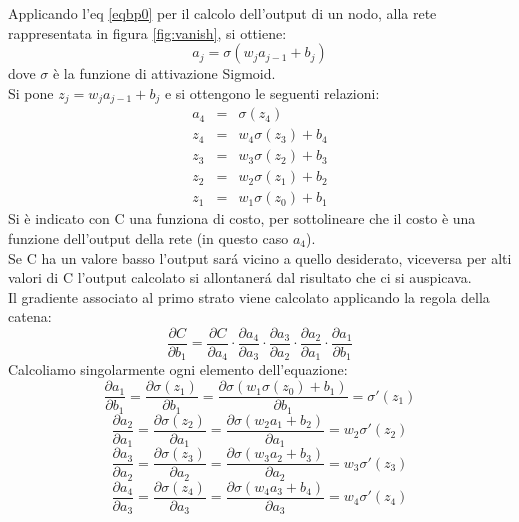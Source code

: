 \documentclass[a4paper,12pt]{report}
\begin{document}
Applicando l'eq \ref{eqbp0} per il calcolo dell'output di un nodo, alla rete rappresentata in figura \ref{fig:vanish}, si ottiene:
\begin{equation}
a_j=\sigma(w_j a_{j-1} +b_j)
\end{equation}
dove $\sigma$ \`e la funzione di attivazione Sigmoid.\\
Si pone $z_j=w_j a_{j-1} +b_j$ e si ottengono le seguenti relazioni:
\begin{eqnarray}
a_4&=&\sigma(z_4)\nonumber \\
z_4&=&w_4 \sigma(z_3)+b_4 \nonumber \\
z_3&=&w_3 \sigma(z_2)+b_3 \nonumber \\
z_2&=&w_2 \sigma(z_1)+b_2 \nonumber \\
z_1&=&w_1 \sigma(z_0)+b_1 \nonumber
\end{eqnarray}
Si \`e indicato con C una funziona di costo, per sottolineare che il costo \`e una funzione dell'output della rete (in questo caso $a_4$).\\
Se C ha un valore basso l'output sar\'{a} vicino a quello desiderato, viceversa per alti valori di C l'output calcolato si allontaner\'{a} dal risultato che ci si auspicava.\\
Il gradiente associato al primo strato viene calcolato applicando la regola della catena:
\begin{equation} \label{catena}
\frac{\partial C}{\partial b_1}=\frac{\partial C}{\partial a_4} \cdot \frac{\partial a_4}{\partial a_3} \cdot \frac{\partial a_3}{\partial a_2} \cdot \frac{\partial a_2}{\partial a_1} \cdot \frac{\partial a_1}{\partial b_1}
\end{equation}
Calcoliamo singolarmente ogni elemento dell'equazione:
\begin{equation}
\frac{\partial a_1}{\partial b_1} = \frac{\partial \sigma (z_1)}{\partial b_1} = \frac{\partial \sigma(w_1 \sigma(z_0)+b_1)}{\partial b_1} = \sigma '(z_1)
\end{equation}
\begin{equation}
\frac{\partial a_2}{\partial a_1}=\frac{\partial \sigma (z_2)}{\partial a_1} = \frac{\partial \sigma(w_2 a_1 +b_2)}{\partial a_1} = w_2 \sigma ' (z_2)
\end{equation}
\begin{equation}
 \frac{\partial a_3}{\partial a_2}=\frac{\partial \sigma (z_3)}{\partial a_2} = \frac{\partial \sigma(w_3 a_2 +b_3)}{\partial a_2} = w_3 \sigma ' (z_3)
\end{equation}
\begin{equation}
 \frac{\partial a_4}{\partial a_3}=\frac{\partial \sigma (z_4)}{\partial a_3} = \frac{\partial \sigma(w_4 a_3 +b_4)}{\partial a_3} = w_4 \sigma ' (z_4)
\end{equation}
\end{document}
